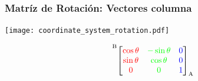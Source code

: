 \begin{frame}
    \frametitle{Matríz de Rotación: Vectores columna}

    \begin{center}
        \begin{minipage}{0.4\linewidth}
            \texttt{[image: coordinate\_system\_rotation.pdf]}
        \end{minipage}
        \hspace{1em}
        \begin{minipage}{0.5\linewidth}
            \begin{equation*}
                \toCoord{\fromCoord{\begin{bmatrix}
                    \textcolor{red}{\cos \theta} & \textcolor{green}{-\sin \theta} & \textcolor{blue}{0}\\
                    \textcolor{red}{\sin \theta} & \textcolor{green}{\cos \theta} & \textcolor{blue}{0}\\
                    \textcolor{red}{0} & \textcolor{green}{0} & \textcolor{blue}{1}
                \end{bmatrix}}{A}}{B}
            \end{equation*}
        \end{minipage}
    \end{center}

\end{frame}

